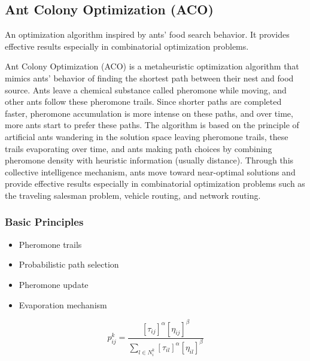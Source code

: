 \subsection{Ant Colony Optimization (ACO)}
An optimization algorithm inspired by ants' food search behavior. It provides effective results especially in combinatorial optimization problems.

Ant Colony Optimization (ACO) is a metaheuristic optimization algorithm that mimics ants' behavior of finding the shortest path between their nest and food source. Ants leave a chemical substance called pheromone while moving, and other ants follow these pheromone trails. Since shorter paths are completed faster, pheromone accumulation is more intense on these paths, and over time, more ants start to prefer these paths. The algorithm is based on the principle of artificial ants wandering in the solution space leaving pheromone trails, these trails evaporating over time, and ants making path choices by combining pheromone density with heuristic information (usually distance). Through this collective intelligence mechanism, ants move toward near-optimal solutions and provide effective results especially in combinatorial optimization problems such as the traveling salesman problem, vehicle routing, and network routing.

\subsubsection{Basic Principles}
\begin{itemize}
    \item Pheromone trails
    \item Probabilistic path selection
    \item Pheromone update
    \item Evaporation mechanism
\end{itemize}

\begin{equation}
p_{ij}^k = \frac{[\tau_{ij}]^\alpha [\eta_{ij}]^\beta}{\sum_{l \in N_i^k} [\tau_{il}]^\alpha [\eta_{il}]^\beta}
\end{equation}


